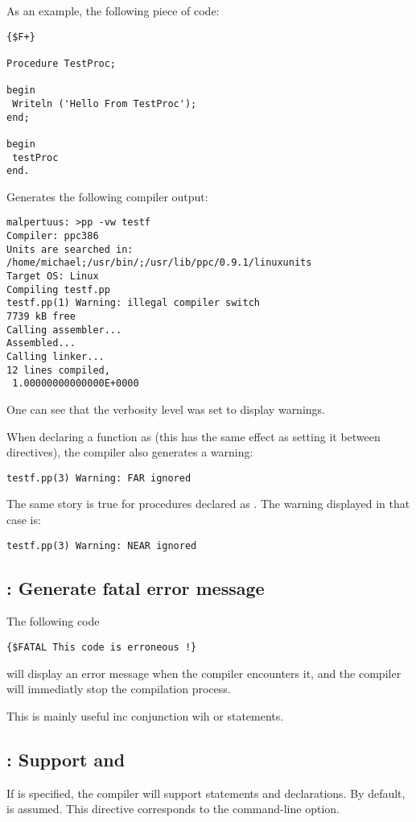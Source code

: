 As an example, the following piece of code:
\begin{verbatim}
{$F+}

Procedure TestProc;

begin
 Writeln ('Hello From TestProc');
end;

begin
 testProc
end.
\end{verbatim}
Generates the following compiler output:
\begin{verbatim}
malpertuus: >pp -vw testf
Compiler: ppc386
Units are searched in: /home/michael;/usr/bin/;/usr/lib/ppc/0.9.1/linuxunits
Target OS: Linux
Compiling testf.pp
testf.pp(1) Warning: illegal compiler switch
7739 kB free
Calling assembler...
Assembled...
Calling linker...
12 lines compiled,
 1.00000000000000E+0000
\end{verbatim}
One can see that the verbosity level was set to display warnings.

When declaring a function as  (this has the same effect as setting it
between  directives), the compiler also generates a
warning:
\begin{verbatim}
testf.pp(3) Warning: FAR ignored
\end{verbatim}

The same story is true for procedures declared as . The warning
displayed in that case is:
\begin{verbatim}
testf.pp(3) Warning: NEAR ignored
\end{verbatim}

\subsection{ : Generate fatal error message}

The following code
\begin{verbatim}
{$FATAL This code is erroneous !}
\end{verbatim}
will display an error message when the compiler encounters it,
and the compiler will immediatly stop the compilation process.

This is mainly useful inc conjunction wih  or
 statements.

\subsection{ : Support  and }

If  is specified, the compiler will support 
statements and  declarations. By default,  is
assumed. This directive corresponds to the  command-line option.

